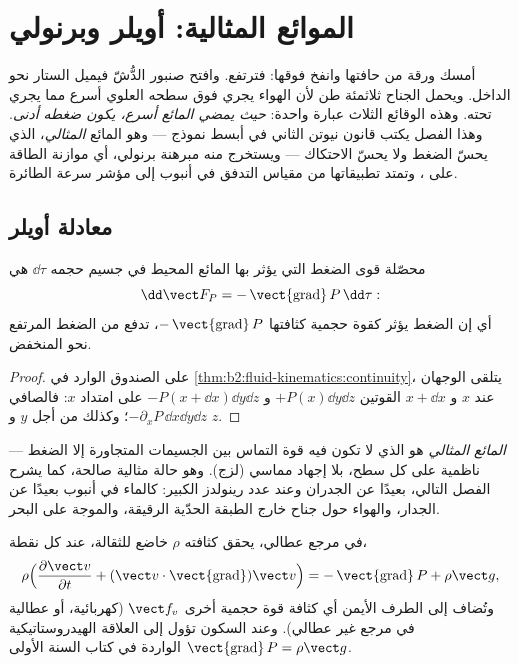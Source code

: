 \chapter{الموائع المثالية: أويلر وبرنولي}\label{ch:b2:euler-bernoulli}

أمسك ورقة من حافتها وانفخ فوقها: فترتفع. وافتح صنبور الدُّشّ
فيميل الستار نحو الداخل. ويحمل الجناح ثلاثمئة طن لأن الهواء
يجري فوق سطحه العلوي أسرع مما يجري تحته. وهذه الوقائع الثلاث
عبارة واحدة: \emph{حيث يمضي المائع أسرع، يكون ضغطه أدنى}. وهذا
الفصل يكتب قانون نيوتن الثاني  في أبسط نموذج ---
وهو المائع \emph{المثالي}، الذي يحسّ الضغط ولا يحسّ الاحتكاك ---
ويستخرج منه مبرهنة برنولي، أي موازنة الطاقة على ،
وتمتد تطبيقاتها من مقياس التدفق في أنبوب إلى مؤشر سرعة
الطائرة.

\section{معادلة أويلر}

\begin{proposition}\label{prop:b2:euler-bernoulli:pressure}
محصّلة قوى الضغط التي يؤثر بها المائع المحيط في جسيم حجمه
$\dd\tau$ هي
\[
\dd\vect F_P = -\operatorname{\vect{grad}}P\,\dd\tau :
\]
أي إن الضغط يؤثر كقوة حجمية كثافتها $-\operatorname{\vect{grad}}P$،
تدفع من الضغط المرتفع نحو المنخفض.
\end{proposition}

\begin{proof}
على الصندوق الوارد في \cref{thm:b2:fluid-kinematics:continuity}، يتلقى
الوجهان عند $x$ و $x + \dd x$ القوتين $+P(x)\dd y\dd z$ و $-P(x + \dd x)\dd y\dd z$
على امتداد $x$: فالصافي $-\partial_xP\,\dd x\dd y\dd z$؛ وكذلك من أجل $y$ و $z$.
\end{proof}

\begin{definition}\label{def:b2:euler-bernoulli:perfect}
\emph{المائع المثالي} هو الذي لا تكون فيه قوة التماس بين
الجسيمات المتجاورة إلا الضغط --- ناظمية على كل سطح، بلا إجهاد
مماسي (لزج). وهو حالة مثالية صالحة، كما يشرح الفصل التالي،
بعيدًا عن الجدران وعند عدد رينولدز الكبير: كالماء في أنبوب
بعيدًا عن الجدار، والهواء حول جناح خارج الطبقة الحدّية
الرقيقة، والموجة على البحر.
\end{definition}

\begin{theorem}\label{thm:b2:euler-bernoulli:euler}
في مرجع عطالي، يحقق  كثافته $\rho$ خاضع للثقالة، عند
كل نقطة،
\[
\rho\Bigl(\frac{\partial\vect v}{\partial t} + (\vect v\cdot\operatorname{\vect{grad}})
\vect v\Bigr) = -\operatorname{\vect{grad}}P + \rho\vect g ,
\]
وتُضاف إلى الطرف الأيمن أي كثافة قوة حجمية أخرى $\vect f_v$
(كهربائية، أو عطالية في مرجع غير عطالي). وعند السكون تؤول إلى
العلاقة الهيدروستاتيكية $\operatorname{\vect{grad}}P = \rho\vect g$ الواردة
في كتاب السنة الأولى.
\end{theorem}

